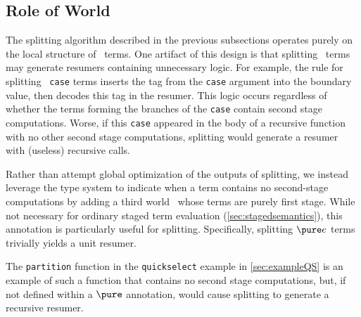 \begin{abstrsyn}
\subsection {Role of World \bbonep}
\label{sec:needGround}

The splitting algorithm described in the previous subsections operates
purely on the local structure of \lang\ terms.  One artifact of this design
is that splitting \bbonem\ terms may generate resumers containing
unnecessary logic.  For example, the rule for splitting
\bbonem\ \texttt{case} terms inserts the tag from the \texttt{case}
argument into the boundary value, then decodes this tag in the
resumer. This logic occurs regardless of whether the terms forming the
branches of the \texttt{case} contain second stage computations.
Worse, if this \texttt{case} appeared in the body of a recursive
function with no other second stage computations, splitting would
generate a resumer with (useless) recursive calls.

Rather than attempt global optimization of the outputs of splitting,
we instead leverage the type system to indicate when a term contains
no second-stage computations by adding a third world \bbonep\ whose
terms are purely first stage.  While not necessary for ordinary staged
term evaluation (\ref{sec:stagedsemantics}), this annotation is
particularly useful for splitting. Specifically, splitting $\pure e$
terms trivially yields a unit resumer.

The \texttt{partition} function in the \texttt{quickselect} example in
\ref{sec:exampleQS} is an example of such a function that contains no
second stage computations, but, if not defined within a $\pure$
annotation, would cause splitting to generate a recursive resumer.

\end{abstrsyn}



